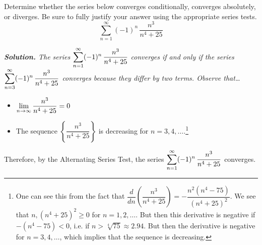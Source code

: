 \documentclass[12pt,letterpaper]{exam}
\begin{document}
\examtitle
{} 
\scores
\bottomline
\newpage


\begin{questions}

\newpage
\question[25] Determine whether the series below converges conditionally, converges absolutely, or diverges. Be sure to fully justify your answer using the appropriate series tests.
	\[
	\sum_{n=1}^\infty (-1)^n \, \dfrac{n^3}{n^4 + 25}
	\] \pspace

{\small\itshape \textbf{Solution.} The series $\displaystyle\sum_{n=1}^\infty (-1)^n \, \dfrac{n^3}{n^4 + 25}$ converges if and only if the series $\displaystyle\sum_{n=3}^\infty (-1)^n \, \dfrac{n^3}{n^4 + 25}$ converges because they differ by two terms. Observe that\dots
	\begin{itemize}
	\item $\displaystyle\lim_{n \to \infty} \dfrac{n^3}{n^4 + 25}= 0$
	\item The sequence $\left\{ \dfrac{n^3}{n^4 + 25} \right\}$ is decreasing for $n= 3, 4, \ldots$.\footnote{\tiny One can see this from the fact that $\dfrac{d}{dn} \left( \dfrac{n^3}{n^4 + 25} \right)= -\dfrac{n^2(n^4 - 75)}{(n^4 + 25)^2}$. We see that $n, (n^4 + 25)^2 \geq 0$ for $n= 1, 2, \ldots$. But then this derivative is negative if $-(n^4 - 75) < 0$, i.e. if $n > \sqrt[4]{75} \approx 2.94$. But then the derivative is negative for $n= 3, 4, \ldots$, which implies that the sequence is decreasing.}
	\end{itemize}
Therefore, by the Alternating Series Test, the series $\displaystyle \sum_{n=1}^\infty (-1)^n \, \dfrac{n^3}{n^4 + 25}$ converges. \pspace

}
\end{questions}
\end{document}
